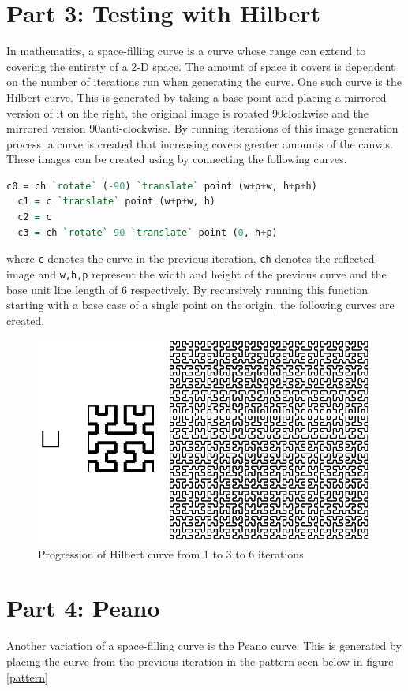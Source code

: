 \documentclass{article}
\begin{document}
\section*{Part 3: Testing with Hilbert}
In mathematics, a space-filling curve is a curve whose range can extend to covering the entirety of a 2-D space. The amount of space it covers is dependent on the number of iterations run when generating the curve. One such curve is the Hilbert curve. This is generated by taking a base point and placing a mirrored version of it on the right, the original image is rotated 90\degree clockwise and the mirrored version 90\degree anti-clockwise. By running iterations of this image generation process, a curve is created that increasing covers greater amounts of the canvas. These images can be created using by connecting the following curves.
\begin{lstlisting}[language=Haskell]
  c0 = ch `rotate` (-90) `translate` point (w+p+w, h+p+h)
  c1 = c `translate` point (w+p+w, h)
  c2 = c
  c3 = ch `rotate` 90 `translate` point (0, h+p)
\end{lstlisting}
where \texttt{c} denotes the curve in the previous iteration, \texttt{ch} denotes the reflected image and \texttt{w,h,p} represent the width and height of the previous curve and the base unit line length of 6 respectively. By recursively running this function starting with a base case of a single point on the origin, the following curves are created.

\begin{figure}[h!]
\center
\caption{Progression of Hilbert curve from 1 to 3 to 6 iterations}
\includegraphics[scale=0.75]{HilbAll.png}
\end{figure}

\section*{Part 4: Peano}
Another variation of a space-filling curve is the Peano curve. This is generated by placing the curve from the previous iteration in the pattern seen below in figure \ref{pattern}
\end{document}
